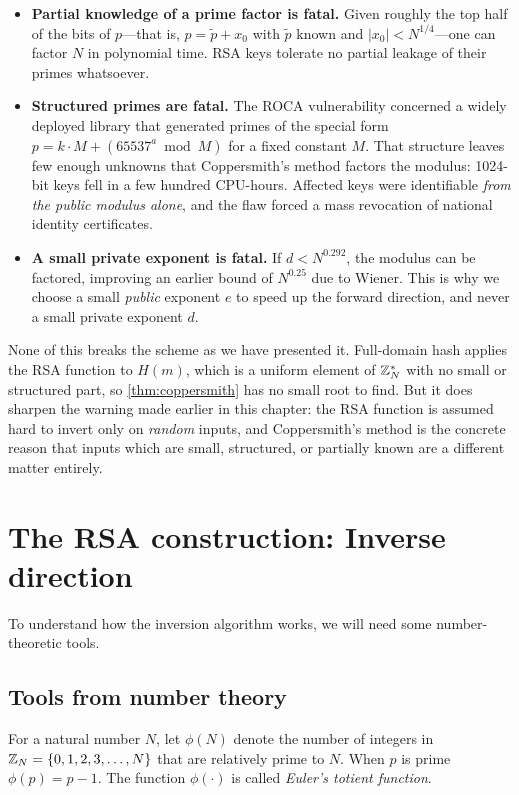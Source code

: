 \begin{itemize}
  \item \textbf{Partial knowledge of a prime factor is fatal.}  Given
    roughly the top half of the bits of $p$---that is, $p = \tilde p +
    x_0$ with $\tilde p$ known and $|x_0| < N^{1/4}$---one can factor
    $N$ in polynomial time.  RSA keys tolerate no partial leakage of
    their primes whatsoever.

  \item \textbf{Structured primes are fatal.}  The ROCA
    vulnerability\autocite{ROCA17} concerned a widely deployed library
    that generated primes of the special form $p = k \cdot M +
    (65537^a \bmod M)$ for a fixed constant $M$.  That structure leaves
    few enough unknowns that Coppersmith's method factors the modulus:
    1024-bit keys fell in a few hundred CPU-hours.  Affected keys were
    identifiable \emph{from the public modulus alone}, and the flaw
    forced a mass revocation of national identity certificates.

  \item \textbf{A small private exponent is fatal.}  If $d <
    N^{0.292}$, the modulus can be factored\autocite{BD99}, improving
    an earlier bound of $N^{0.25}$ due to Wiener.  This is why we choose
    a small \emph{public} exponent $e$ to speed up the forward
    direction, and never a small private exponent $d$.
\end{itemize}

None of this breaks the scheme as we have presented it.  Full-domain
hash applies the RSA function to $H(m)$, which is a uniform element of
$\mathbb{Z}^*_N$ with no small or structured part, so \cref{thm:coppersmith}
has no small root to find.  But it does sharpen the warning made
earlier in this chapter: the RSA function is assumed hard to invert only on
\emph{random} inputs, and Coppersmith's method is the concrete reason
that inputs which are small, structured, or partially known are a
different matter entirely.

\section{The RSA construction: Inverse direction}

To understand how the inversion algorithm works, we will need some
number-theoretic tools.


\subsection{Tools from number theory}
For a natural number $N$, let $\phi(N)$ denote the number of integers
in $\mathbb{Z}_N = \{0, 1, 2, 3, \dots, N\}$ that are relatively prime to $N$.
When $p$ is prime $\phi(p) = p-1$.
The function $\phi(\cdot)$ is called \emph{Euler's totient function}.

